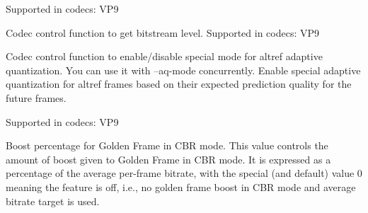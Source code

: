 \begin{Desc}
\begin{description}
Supported in codecs\+: V\+P9 \item[{\em 
V\+P9\+E\+\_\+\+G\+E\+T\+\_\+\+L\+E\+V\+EL\hypertarget{group__vp8__encoder_gga6deae3d561c838952552c3d3756322eca3030515b85602b997d76b6e26093708b}{}\label{group__vp8__encoder_gga6deae3d561c838952552c3d3756322eca3030515b85602b997d76b6e26093708b}
}]Codec control function to get bitstream level. Supported in codecs\+: V\+P9 \item[{\em 
V\+P9\+E\+\_\+\+S\+E\+T\+\_\+\+A\+L\+T\+\_\+\+R\+E\+F\+\_\+\+AQ\hypertarget{group__vp8__encoder_gga6deae3d561c838952552c3d3756322ecaee9ecd5c9530a1bb3a770c9aee6c1f66}{}\label{group__vp8__encoder_gga6deae3d561c838952552c3d3756322ecaee9ecd5c9530a1bb3a770c9aee6c1f66}
}]Codec control function to enable/disable special mode for altref adaptive quantization. You can use it with --aq-\/mode concurrently. Enable special adaptive quantization for altref frames based on their expected prediction quality for the future frames.

Supported in codecs\+: V\+P9 \item[{\em 
V\+P8\+E\+\_\+\+S\+E\+T\+\_\+\+G\+F\+\_\+\+C\+B\+R\+\_\+\+B\+O\+O\+S\+T\+\_\+\+P\+CT\hypertarget{group__vp8__encoder_gga6deae3d561c838952552c3d3756322eca816c34530f29b611644592f439addfae}{}\label{group__vp8__encoder_gga6deae3d561c838952552c3d3756322eca816c34530f29b611644592f439addfae}
}]Boost percentage for Golden Frame in C\+BR mode. This value controls the amount of boost given to Golden Frame in C\+BR mode. It is expressed as a percentage of the average per-\/frame bitrate, with the special (and default) value 0 meaning the feature is off, i.\+e., no golden frame boost in C\+BR mode and average bitrate target is used.


\end{description}
\end{Desc}
